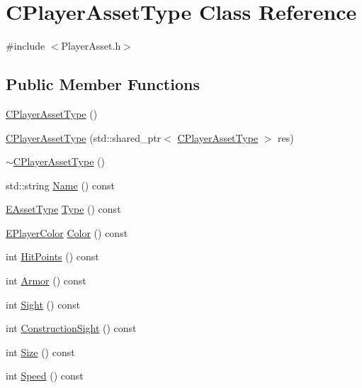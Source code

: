 \hypertarget{classCPlayerAssetType}{}\section{C\+Player\+Asset\+Type Class Reference}
\label{classCPlayerAssetType}


{\ttfamily \#include $<$Player\+Asset.\+h$>$}

\subsection*{Public Member Functions}
\begin{DoxyCompactItemize}
\item 
\hyperlink{classCPlayerAssetType_a2f8429c4ef261d52ea6ded8d7b4e09ee}{C\+Player\+Asset\+Type} ()
\item 
\hyperlink{classCPlayerAssetType_af571a936c745e23f1f3c6777af594efe}{C\+Player\+Asset\+Type} (std\+::shared\+\_\+ptr$<$ \hyperlink{classCPlayerAssetType}{C\+Player\+Asset\+Type} $>$ res)
\item 
\hyperlink{classCPlayerAssetType_a9947252d810ba38966f0bae54f35c7b4}{$\sim$\+C\+Player\+Asset\+Type} ()
\item 
std\+::string \hyperlink{classCPlayerAssetType_afd1b77119e34b459918551a08012ed35}{Name} () const
\item 
\hyperlink{GameDataTypes_8h_a5600d4fc433b83300308921974477fec}{E\+Asset\+Type} \hyperlink{classCPlayerAssetType_a09046fe07dd1f9d19c644dba1efac24b}{Type} () const
\item 
\hyperlink{GameDataTypes_8h_aafb0ca75933357ff28a6d7efbdd7602f}{E\+Player\+Color} \hyperlink{classCPlayerAssetType_a88770c47bf56913f432c4ec45ea5c2da}{Color} () const
\item 
int \hyperlink{classCPlayerAssetType_ad82c75660f1c40d7cb0cf0d08b93e007}{Hit\+Points} () const
\item 
int \hyperlink{classCPlayerAssetType_a2db08d14d9763a2ed0d7954a16ba0709}{Armor} () const
\item 
int \hyperlink{classCPlayerAssetType_aaa744aa1d6c284f91e46dfc7c04bef88}{Sight} () const
\item 
int \hyperlink{classCPlayerAssetType_aef20d622ca84065ce95162eaecc4c31d}{Construction\+Sight} () const
\item 
int \hyperlink{classCPlayerAssetType_afbddb44e9ff99768f18034bcc1daaeaa}{Size} () const
\item 
int \hyperlink{classCPlayerAssetType_a6d9ea6aa96593e3e08401972b82a705d}{Speed} () const

\end{DoxyCompactItemize}
